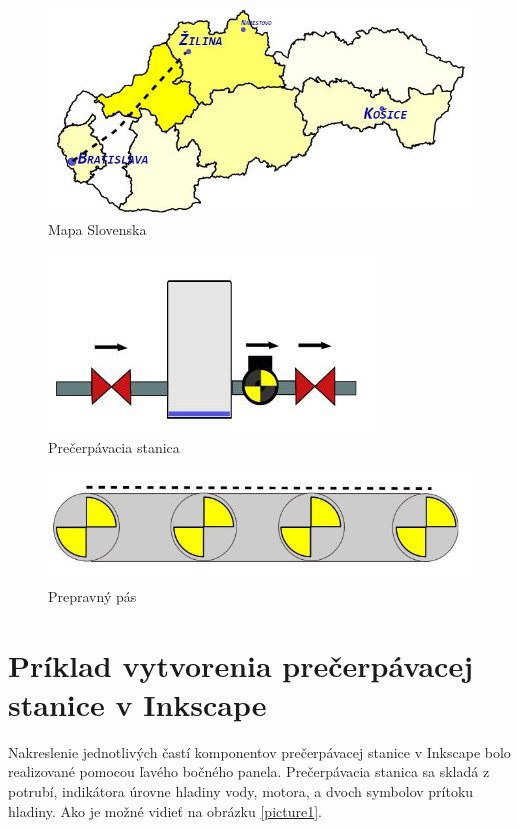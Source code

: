 \begin{figure}[H]
	\centering
	\includegraphics[width=0.7\linewidth]{obrazky/map}
	\caption{Mapa Slovenska}
	\label{fig:map}
\end{figure}

\begin{figure}[H]
	\centering
	\includegraphics[width=0.7\linewidth]{obrazky/pump}
	\caption{Prečerpávacia stanica}
	\label{fig:pump}
\end{figure}
\begin{figure}[H]
	\centering
	\includegraphics[width=0.7\linewidth]{obrazky/belt}
	\caption{Prepravný pás}
	\label{fig:belt}
\end{figure}


\section{Príklad vytvorenia prečerpávacej stanice v Inkscape}

Nakreslenie jednotlivých častí komponentov prečerpávacej stanice v Inkscape bolo realizované pomocou ľavého bočného panela. Prečerpávacia stanica sa skladá z potrubí, indikátora úrovne hladiny vody, motora, a dvoch symbolov prítoku hladiny. Ako je možné vidieť na obrázku  \ref{picture1}.  


